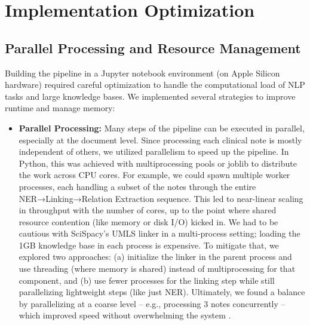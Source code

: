 \section{Implementation Optimization}
\label{sec:optimization}

\subsection{Parallel Processing and Resource Management}

Building the pipeline in a Jupyter notebook environment (on Apple Silicon hardware) required careful optimization to handle the computational load of NLP tasks and large knowledge bases. We implemented several strategies to improve runtime and manage memory:

\begin{itemize}
\item \textbf{Parallel Processing:} Many steps of the pipeline can be executed in parallel, especially at the document level. Since processing each clinical note is mostly independent of others, we utilized parallelism to speed up the pipeline. In Python, this was achieved with multiprocessing pools or joblib to distribute the work across CPU cores. For example, we could spawn multiple worker processes, each handling a subset of the notes through the entire NER→Linking→Relation Extraction sequence. This led to near-linear scaling in throughput with the number of cores, up to the point where shared resource contention (like memory or disk I/O) kicked in. We had to be cautious with SciSpacy's UMLS linker in a multi-process setting; loading the 1GB knowledge base in each process is expensive. To mitigate that, we explored two approaches: (a) initialize the linker in the parent process and use threading (where memory is shared) instead of multiprocessing for that component, and (b) use fewer processes for the linking step while still parallelizing lightweight steps (like just NER). Ultimately, we found a balance by parallelizing at a coarse level – e.g., processing 3 notes concurrently – which improved speed without overwhelming the system \parencite{McKerns2021}.


\end{itemize}
